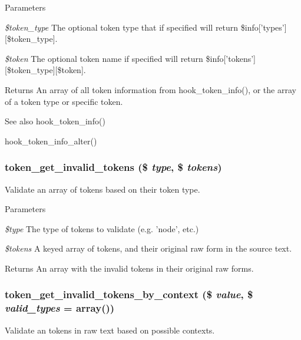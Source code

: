 \begin{DoxyParams}{Parameters}
\item[{\em \$token\_\-type}]The optional token type that if specified will return \$info\mbox{[}'types'\mbox{]}\mbox{[}\$token\_\-type\mbox{]}. \item[{\em \$token}]The optional token name if specified will return \$info\mbox{[}'tokens'\mbox{]}\mbox{[}\$token\_\-type\mbox{]}\mbox{[}\$token\mbox{]}.\end{DoxyParams}
\begin{DoxyReturn}{Returns}
An array of all token information from hook\_\-token\_\-info(), or the array of a token type or specific token.
\end{DoxyReturn}
\begin{DoxySeeAlso}{See also}
hook\_\-token\_\-info() 

hook\_\-token\_\-info\_\-alter() 
\end{DoxySeeAlso}
\hypertarget{token_8module_a1b020d15d269cf5fa17cb7861d105687}{
\subsubsection[{token\_\-get\_\-invalid\_\-tokens}]{\setlength{\rightskip}{0pt plus 5cm}token\_\-get\_\-invalid\_\-tokens (\$ {\em type}, \/  \$ {\em tokens})}}
\label{token_8module_a1b020d15d269cf5fa17cb7861d105687}
Validate an array of tokens based on their token type.


\begin{DoxyParams}{Parameters}
\item[{\em \$type}]The type of tokens to validate (e.g. 'node', etc.) \item[{\em \$tokens}]A keyed array of tokens, and their original raw form in the source text. \end{DoxyParams}
\begin{DoxyReturn}{Returns}
An array with the invalid tokens in their original raw forms. 
\end{DoxyReturn}
\hypertarget{token_8module_a8a2c76f5c0318bb7834f89c4a32e11f0}{
\subsubsection[{token\_\-get\_\-invalid\_\-tokens\_\-by\_\-context}]{\setlength{\rightskip}{0pt plus 5cm}token\_\-get\_\-invalid\_\-tokens\_\-by\_\-context (\$ {\em value}, \/  \$ {\em valid\_\-types} = {\ttfamily array()})}}
\label{token_8module_a8a2c76f5c0318bb7834f89c4a32e11f0}
Validate an tokens in raw text based on possible contexts.


